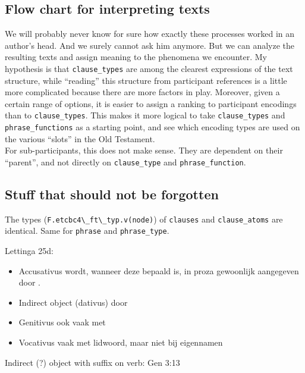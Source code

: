 \documentclass{report}
\newcommand{\mi}[1]{\lstinline{#1}}
\newcommand{\hebr}[1]{\cjRL{#1}}
\begin{document}
\subsection{Flow chart for interpreting texts}
We will probably never know for sure how exactly these processes worked in an author's head. And we surely cannot ask him anymore. But we can analyze the resulting texts and assign meaning to the phenomena we encounter. My hypothesis is that \mi{clause_types} are among the clearest expressions of the text structure, while ``reading'' this structure from participant references is a little more complicated because there are more factors in play. Moreover, given a certain range of options, it is easier to assign a ranking to participant encodings than to \mi{clause_types}. This makes it more logical to take \mi{clause_types} and \mi{phrase_functions} as a starting point, and see which encoding types are used on the various ``slots'' in the Old Testament.\\
For sub-participants, this does not make sense. They are dependent on their ``parent'', and not directly on \mi{clause_type} and \mi{phrase_function}.


\subsection{Stuff that should not be forgotten}
The types (\mi{F.etcbc4\_ft\_typ.v(node)}) of \mi{clauses} and \mi{clause_atoms} are identical. Same for \mi{phrase} and \mi{phrase_type}.

Lettinga 25d:
\begin{itemize}
\item Accusativus wordt, wanneer deze bepaald is, in proza gewoonlijk aangegeven door \hebr{>T}.
\item Indirect object (dativus) door \hebr{L}
\item Genitivus ook vaak met \hebr{L}
\item Vocativus vaak met lidwoord, maar niet bij eigennamen
\end{itemize}

Indirect (?) object with suffix on verb: Gen 3:13

\end{document}
